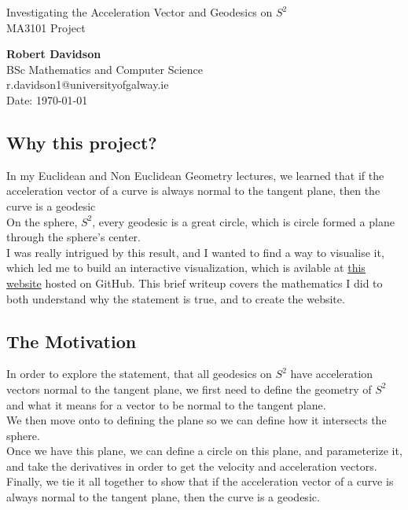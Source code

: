 \documentclass[11pt]{article}
\begin{document}
\begin{center}
    \vspace{0.5cm}
    Investigating the Acceleration Vector and Geodesics on $S^2$\\
    MA3101 Project\\[24pt]
    \LARGE

    \Large
    \textbf{Robert Davidson}\\[6pt]
    \small
    BSc Mathematics and Computer Science \\ r.davidson1@universityofgalway.ie\\[6pt]
    Date: \today\\[12pt]
\end{center}

\vspace{1.5cm}

\subsection*{Why this project?}
In my Euclidean and Non Euclidean Geometry lectures, we learned that if the acceleration vector of a curve is always normal to the tangent plane, then the curve is a geodesic\\[0.5ex]
On the sphere, $S^2$, every geodesic is a great circle, which is circle formed a plane through the sphere's center. \\[0.5ex]
I was really intrigued by this result, and I wanted to find a way to visualise it, which led me to build an interactive visualization, which is avilable at \href{https://robertdavidson1.github.io/MA3101Project/}{this website} hosted on GitHub.
This brief writeup covers the mathematics I did to both understand why the statement is true, and to create the website. 

\subsection*{The Motivation}
In order to explore the statement, that all geodesics on $S^2$ have acceleration vectors normal to the tangent plane, we first need to define the geometry of $S^2$ and what it means for a vector to be normal to the tangent plane. \\[0.5ex] We then move onto to defining the plane so we can define how it intersects the sphere. \\[0.5ex]
Once we have this plane, we can define a circle on this plane, and parameterize it, and take the derivatives in order to get the velocity and acceleration vectors. \\[0.5ex]
Finally, we tie it all together to show that if the acceleration vector of a curve is always normal to the tangent plane, then the curve is a geodesic. 
\end{document}
